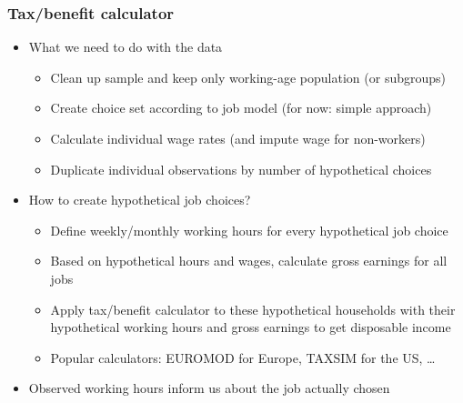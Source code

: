 \documentclass[handout,intlimits]{beamer}
\def\blue#1{\textcolor{zewblue}{#1}}
\begin{document}
\begin{frame}
\frametitle{Tax/benefit calculator}
\begin{itemize}
	\item \blue{What we need to do with the data}
	\begin{itemize}
		\item Clean up sample and keep only working-age population (or subgroups)
		\smallskip
		\item Create choice set according to job model (for now: simple approach)
		\smallskip
		\item Calculate individual wage rates (and impute wage for non-workers)
		\smallskip
		\item Duplicate individual observations by number of hypothetical choices
	\end{itemize}
	\bigskip
	\item \blue{How to create hypothetical job choices?}
	\begin{itemize}
		\item Define weekly/monthly working hours for every hypothetical job choice
		\smallskip
		\item Based on hypothetical hours and wages, calculate gross earnings for all jobs
		\smallskip
		\item Apply tax/benefit calculator to these hypothetical households with their hypothetical working hours and gross earnings to get disposable income
		\smallskip
		\item Popular calculators: EUROMOD for Europe, TAXSIM for the US, \dots
	\end{itemize}
	\bigskip
	\item \blue{Observed working hours inform us about the job actually chosen}
\end{itemize}
\end{frame}
\end{document}
